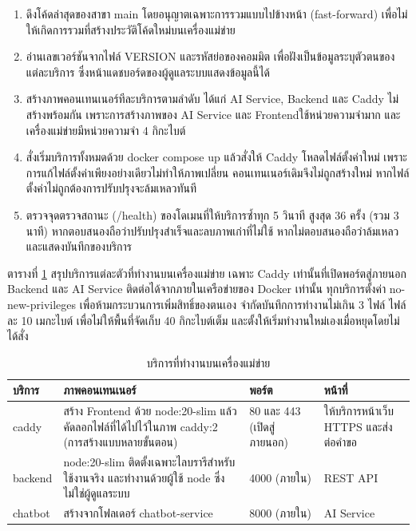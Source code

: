 \begin{enumerate}
\item ดึงโค้ดล่าสุดของสาขา main โดยอนุญาตเฉพาะการรวมแบบไปข้างหน้า (fast-forward) เพื่อไม่ให้เกิดการรวมที่สร้างประวัติโค้ดใหม่บนเครื่องแม่ข่าย
\item อ่านเลขเวอร์ชันจากไฟล์ VERSION และรหัสย่อของคอมมิต เพื่อฝังเป็นข้อมูลระบุตัวตนของแต่ละบริการ ซึ่งหน้าแดชบอร์ดของผู้ดูแลระบบแสดงข้อมูลนี้ได้
\item สร้างภาพคอนเทนเนอร์ทีละบริการตามลำดับ ได้แก่ AI Service, Backend และ Caddy ไม่สร้างพร้อมกัน เพราะการสร้างภาพของ AI Service และ Frontendใช้หน่วยความจำมาก และเครื่องแม่ข่ายมีหน่วยความจำ 4 กิกะไบต์
\item สั่งเริ่มบริการทั้งหมดด้วย docker compose up แล้วสั่งให้ Caddy โหลดไฟล์ตั้งค่าใหม่ เพราะการแก้ไฟล์ตั้งค่าเพียงอย่างเดียวไม่ทำให้ภาพเปลี่ยน คอนเทนเนอร์เดิมจึงไม่ถูกสร้างใหม่ หากไฟล์ตั้งค่าไม่ถูกต้องการปรับปรุงจะล้มเหลวทันที
\item ตรวจจุดตรวจสถานะ (/health) ของโดเมนที่ให้บริการซ้ำทุก 5 วินาที สูงสุด 36 ครั้ง (รวม 3 นาที) หากตอบสนองถือว่าปรับปรุงสำเร็จและลบภาพเก่าที่ไม่ใช้ หากไม่ตอบสนองถือว่าล้มเหลวและแสดงบันทึกของบริการ
\end{enumerate}

ตารางที่ \ref{tab:deploy_services} สรุปบริการแต่ละตัวที่ทำงานบนเครื่องแม่ข่าย เฉพาะ Caddy เท่านั้นที่เปิดพอร์ตสู่ภายนอก Backend และ AI Service ติดต่อได้จากภายในเครือข่ายของ Docker เท่านั้น ทุกบริการตั้งค่า no-new-privileges เพื่อห้ามกระบวนการเพิ่มสิทธิ์ของตนเอง จำกัดบันทึกการทำงานไม่เกิน 3 ไฟล์ ไฟล์ละ 10 เมกะไบต์ เพื่อไม่ให้พื้นที่จัดเก็บ 40 กิกะไบต์เต็ม และตั้งให้เริ่มทำงานใหม่เองเมื่อหยุดโดยไม่ได้สั่ง

\nopagebreak
\begin{table}[H]
\centering
\caption{บริการที่ทำงานบนเครื่องแม่ข่าย}
\label{tab:deploy_services}
\begin{tabular}{|l|p{6.2cm}|p{2.2cm}|p{3cm}|}
\hline
\textbf{บริการ} & \textbf{ภาพคอนเทนเนอร์} & \textbf{พอร์ต} & \textbf{หน้าที่} \\
\hline
caddy & สร้าง Frontend ด้วย node:20-slim แล้วคัดลอกไฟล์ที่ได้ไปไว้ในภาพ caddy:2 (การสร้างแบบหลายขั้นตอน) & 80 และ 443 (เปิดสู่ภายนอก) & ให้บริการหน้าเว็บ HTTPS และส่งต่อคำขอ \\ \hline
backend & node:20-slim ติดตั้งเฉพาะไลบรารีสำหรับใช้งานจริง และทำงานด้วยผู้ใช้ node ซึ่งไม่ใช่ผู้ดูแลระบบ & 4000 (ภายใน) & REST API \\ \hline
chatbot & สร้างจากโฟลเดอร์ chatbot-service & 8000 (ภายใน) & AI Service \\
\hline
\end{tabular}
\end{table}

